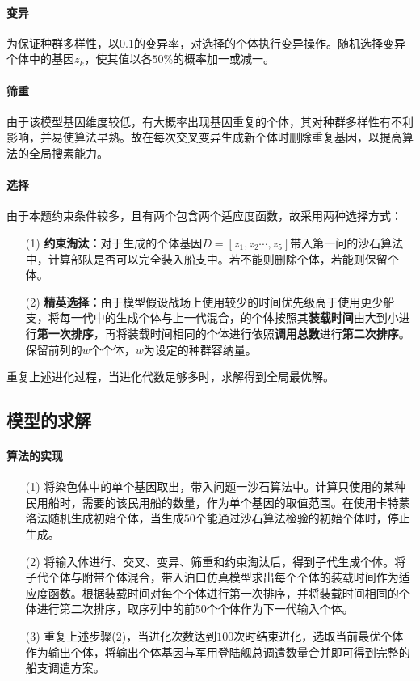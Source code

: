 \documentclass{whutmod}
\begin{document}
     \paragraph{变异}
     为保证种群多样性，以$0.1$的变异率，对选择的个体执行变异操作。随机选择变异个体中的基因$z_{k}$，使其值以各$50\%$的概率加一或减一。
     \paragraph{筛重}
     由于该模型基因维度较低，有大概率出现基因重复的个体，其对种群多样性有不利影响，并易使算法早熟。故在每次交叉变异生成新个体时删除重复基因，以提高算法的全局搜素能力。
     \paragraph{选择}
     由于本题约束条件较多，且有两个包含两个适应度函数，故采用两种选择方式：
     \begin{itemize}
     \item [(1)] \textbf{约束淘汰：}对于生成的个体基因$D=[z_{1},z_{2}\cdots,z_{5}]$带入第一问的沙石算法中，计算部队是否可以完全装入船支中。若不能则删除个体，若能则保留个体。
     \item [(2)]\textbf{精英选择：}由于模型假设战场上使用较少的时间优先级高于使用更少船支，将每一代中的生成个体与上一代混合，的个体按照其\textbf{装载时间}由大到小进行\textbf{第一次排序}，再将装载时间相同的个体进行依照\textbf{调用总数}进行\textbf{第二次排序}。保留前列的$w$个个体，$w$为设定的种群容纳量。
     \end{itemize}
     重复上述进化过程，当进化代数足够多时，求解得到全局最优解。

     \subsection{模型的求解}
   	 \paragraph{算法的实现}
   	 	\begin{itemize}
   	 	\item [(1)] 将染色体中的单个基因取出，带入问题一沙石算法中。计算只使用的某种民用船时，需要的该民用船的数量，作为单个基因的取值范围。在使用卡特蒙洛法随机生成初始个体，当生成$50$个能通过沙石算法检验的初始个体时，停止生成。
   	 	\item [(2)]将输入体进行、交叉、变异、筛重和约束淘汰后，得到子代生成个体。将子代个体与附带个体混合，带入泊口仿真模型求出每个个体的装载时间作为适应度函数。根据装载时间对每个个体进行第一次排序，并将装载时间相同的个体进行第二次排序，取序列中的前$50$个个体作为下一代输入个体。
   	 	\item [(3)]重复上述步骤(2)，当进化次数达到$100$次时结束进化，选取当前最优个体作为输出个体，将输出个体基因与军用登陆舰总调遣数量合并即可得到完整的船支调遣方案。
   	 	 \end{itemize}
\end{document}
